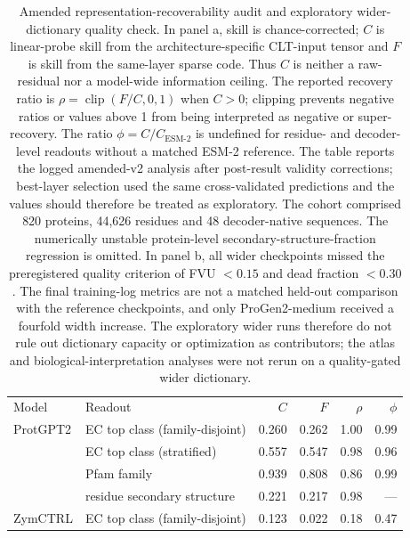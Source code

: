 \documentclass[pdflatex,sn-nature]{sn-jnl}
\begin{document}
\clearpage

\begin{table}[p!]
\caption{Amended representation-recoverability audit and exploratory wider-dictionary quality check. In panel a, skill is chance-corrected; $C$ is linear-probe skill from the architecture-specific CLT-input tensor and $F$ is skill from the same-layer sparse code. Thus $C$ is neither a raw-residual nor a model-wide information ceiling. The reported recovery ratio is $\rho=\operatorname{clip}(F/C,0,1)$ when $C>0$; clipping prevents negative ratios or values above 1 from being interpreted as negative or super-recovery. The ratio $\phi=C/C_{\mathrm{ESM\text{-}2}}$ is undefined for residue- and decoder-level readouts without a matched ESM-2 reference. The table reports the logged amended-v2 analysis after post-result validity corrections; best-layer selection used the same cross-validated predictions and the values should therefore be treated as exploratory. The cohort comprised 820 proteins, 44,626 residues and 48 decoder-native sequences. The numerically unstable protein-level secondary-structure-fraction regression is omitted. In panel b, all wider checkpoints missed the preregistered quality criterion of FVU $<0.15$ and dead fraction $<0.30$. The final training-log metrics are not a matched held-out comparison with the reference checkpoints, and only ProGen2-medium received a fourfold width increase. The exploratory wider runs therefore do not rule out dictionary capacity or optimization as contributors; the atlas and biological-interpretation analyses were not rerun on a quality-gated wider dictionary.}
\label{tab:supp-recoverability}
\scriptsize
\setlength{\tabcolsep}{2pt}
\begin{tabular}{@{}>{\raggedright\arraybackslash}p{2.4cm}>{\raggedright\arraybackslash}p{3.5cm}rrrr@{}}
\multicolumn{6}{@{}l}{\textbf{a, Amended reference-dictionary probe results.}} \\[3pt]
\toprule
Model & Readout & $C$ & $F$ & $\rho$ & $\phi$ \\
\midrule
ProtGPT2 & EC top class (family-disjoint) & 0.260 & 0.262 & 1.00 & 0.99 \\
 & EC top class (stratified) & 0.557 & 0.547 & 0.98 & 0.96 \\
 & Pfam family & 0.939 & 0.808 & 0.86 & 0.99 \\
 & residue secondary structure & 0.221 & 0.217 & 0.98 & --- \\
ZymCTRL & EC top class (family-disjoint) & 0.123 & 0.022 & 0.18 & 0.47 \\

\end{tabular}
\end{table}
\end{document}
